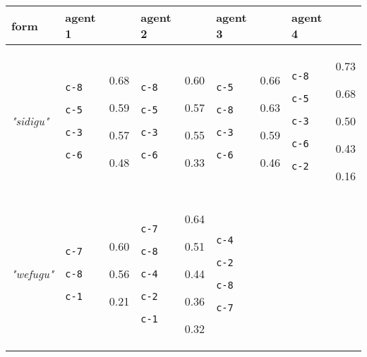 
{\renewcommand{\arraystretch}{1.5}
\begin{tabular}{@{}p{1.2cm}|p{1.3cm}@{}p{0.8cm}@{}|p{1.3cm}@{}p{0.8cm}@{}|p{1.3cm}@{}p{0.8cm}@{}|p{1.3cm}@{}p{0.8cm}@{}}
form & agent 1 &  & agent 2 &  & agent 3 &  & agent 4 & \\
\hline
\textit{"sidigu"} & \texttt{c-8}

\texttt{c-5}

\texttt{c-3}

\texttt{c-6} & 0.68

0.59

0.57

0.48 & \texttt{c-8}

\texttt{c-5}

\texttt{c-3}

\texttt{c-6} & 0.60

0.57

0.55

0.33 & \texttt{c-5}

\texttt{c-8}

\texttt{c-3}

\texttt{c-6} & 0.66

0.63

0.59

0.46 & \texttt{c-8}

\texttt{c-5}

\texttt{c-3}

\texttt{c-6}

\texttt{c-2} & 0.73

0.68

0.50

0.43

0.16\\
\hline
\textit{"wefugu"} & \texttt{c-7}

\texttt{c-8}

\texttt{c-1} & 0.60

0.56

0.21 & \texttt{c-7}

\texttt{c-8}

\texttt{c-4}

\texttt{c-2}

\texttt{c-1} & 0.64

0.51

0.44

0.36

0.32 & \texttt{c-4}

\texttt{c-2}

\texttt{c-8}

\texttt{c-7}


\end{tabular}}

